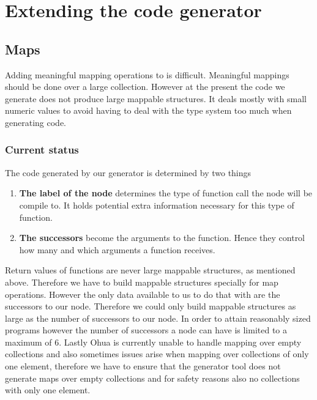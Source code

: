 \chapter{Extending the code generator}


\label{ch:extending-code-generator}

\section{Maps}

Adding meaningful mapping operations to is difficult.
Meaningful mappings should be done over a large collection.
However at the present the code we generate does not produce large mappable structures.
It deals mostly with small numeric values to avoid having to deal with the type system too much when generating code.

\subsection{Current status}

The code generated by our generator is determined by two things

\begin{enumerate}
    \item \textbf{The label of the node} determines the type of function call the node will be compile to.
          It holds potential extra information necessary for this type of function.
    \item \textbf{The successors} become the arguments to the function. Hence they control how many and which arguments a function receives.
\end{enumerate}

Return values of functions are never large mappable structures, as mentioned above.
Therefore we have to build mappable structures specially for map operations.
However the only data available to us to do that with are the successors to our node.
Therefore we could only build mappable structures as large as the number of successors to our node.
In order to attain reasonably sized programs however the number of successors a node can have is limited to a maximum of 6.
Lastly Ohua is currently unable to handle mapping over empty collections and also sometimes issues arise when mapping over collections of only one element, therefore we have to ensure that the generator tool does not generate maps over empty collections and for safety reasons also no collections with only one element.

